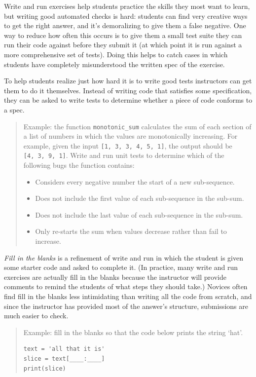 \documentclass[10pt,statementpaper]{memoir}
\providecommand{\tightlist}{%
  \setlength{\itemsep}{0pt}\setlength{\parskip}{0pt}}
\begin{document}
Write and run exercises help students practice the skills they most want
to learn, but writing good automated checks is hard: students can find
very creative ways to get the right answer, and it's demoralizing to
give them a false negative. One way to reduce how often this occurs is
to give them a small test suite they can run their code against before
they submit it (at which point it is run against a more comprehensive
set of tests). Doing this helps to catch cases in which students have
completely misunderstood the written spec of the exercise.

To help students realize just how hard it is to write good tests
instructors can get them to do it themselves. Instead of writing code
that satisfies some specification, they can be asked to write tests to
determine whether a piece of code conforms to a spec.

\begin{quote}
Example: the function \texttt{monotonic\_sum} calculates the sum of each
section of a list of numbers in which the values are monotonically
increasing. For example, given the input
\texttt{{[}1,\ 3,\ 3,\ 4,\ 5,\ 1{]}}, the output should be
\texttt{{[}4,\ 3,\ 9,\ 1{]}}. Write and run unit tests to determine
which of the following bugs the function contains:

\begin{itemize}
\tightlist
\item
  Considers every negative number the start of a new sub-sequence.
\item
  Does not include the first value of each sub-sequence in the sub-sum.
\item
  Does not include the last value of each sub-sequence in the sub-sum.
\item
  Only re-starts the sum when values decrease rather than fail to
  increase.
\end{itemize}
\end{quote}

\emph{Fill in the blanks} is a refinement of write and run in which the
student is given some starter code and asked to complete it. (In
practice, many write and run exercises are actually fill in the blanks
because the instructor will provide comments to remind the students of
what steps they should take.) Novices often find fill in the blanks less
intimidating than writing all the code from scratch, and since the
instructor has provided most of the answer's structure, submissions are
much easier to check.

\begin{quote}
Example: fill in the blanks so that the code below prints the string
`hat'.

\begin{verbatim}
text = 'all that it is'
slice = text[____:____]
print(slice)
\end{verbatim}
\end{quote}
\end{document}
